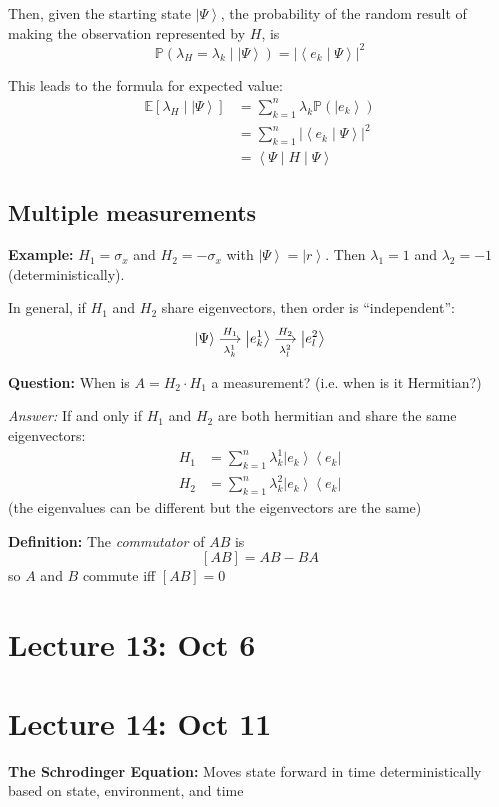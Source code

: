 \documentclass[12pt]{article}
\renewcommand{\P}{\mathbb{P}}
\newcommand{\brak}[1]{\left\langle #1 \right\rangle}
\newcommand{\bra}[1]{\left\langle #1 \right\vert }
\newcommand{\ket}[1]{\left\vert #1 \right\rangle}
\newcommand{\E}{\mathbb{E}}
\begin{document}
Then, given the starting state $\ket{\Psi}$, the probability of the random result of making the observation represented by $H$, is 
\[\P(\lambda_H = \lambda_k \; | \; \ket{\Psi}) = \big\vert \brak{e_k \; | \; \Psi}\big \vert^2\]

This leads to the formula for expected value:
\begin{align*}
    \E[\lambda_H \; | \; \ket \Psi] &= \sum_{k=1}^n \lambda_k \P(\ket{e_k})\\
    &= \sum_{k=1}^n \big\vert \brak{e_k \; | \; \Psi} \big\vert^2\\
    &= \brak{\Psi \; | \; H \; | \; \Psi}
\end{align*}

\subsection*{Multiple measurements}
\textbf{Example:} $H_1 = \sigma_x$ and $H_2 = -\sigma_x$ with $\ket \Psi = \ket r$. Then $\lambda_1 = 1$ and $\lambda_2 = -1$ (deterministically).

In general, if $H_1$ and $H_2$ share eigenvectors, then order is ``independent'':
\[\ket \Psi \overunderset{H_1}{\lambda_k^1}{\longrightarrow} \ket{e_k^1} \overunderset{H_2}{\lambda_l^2}{\longrightarrow} \ket{e_l^2}\]

\textbf{Question:} When is $A = H_2 \cdot H_1$ a measurement? (i.e. when is it Hermitian?)

\emph{Answer:} If and only if $H_1$ and $H_2$ are both hermitian and share the same eigenvectors:
\begin{align*}
    H_1 &= \sum_{k=1}^n \lambda_k^1 \ket{e_k} \bra{e_k}\\
    H_2 &= \sum_{k=1}^n \lambda_k^2 \ket{e_k} \bra{e_k}
\end{align*}
(the eigenvalues can be different but the eigenvectors are the same)

\textbf{Definition:} The \emph{commutator} of $AB$ is 
\[[AB] = AB - BA\]
so $A$ and $B$ commute iff $[AB] = 0$

\section*{Lecture 13: Oct 6}

\section*{Lecture 14: Oct 11}
\textbf{The Schrodinger Equation:} Moves state forward in time deterministically based on state, environment, and time 
\end{document}
